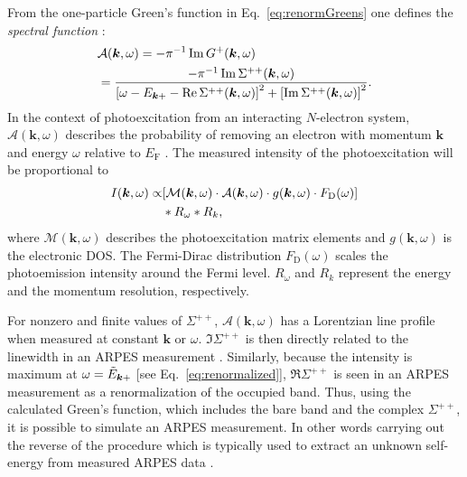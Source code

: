 \documentclass[aps, prb, twocolumn,amsmath,amssymb,floatfix]{revtex4-2}
\begin{document}

From the one-particle Green's function in Eq.~\eqref{eq:renormGreens} one  defines the  \emph{spectral function} \cite{damascelli2004probing}:
\begin{align}\label{eq:spectral}
    &\mathcal{A}(\boldsymbol{k},\omega) = -\pi^{-1}\Im G^+(\boldsymbol{k},\omega) \nonumber \\ &=\frac{-\pi^{-1}\Im\Sigma^{++}(\boldsymbol{k},\omega)}{\bqty{\omega-E_{\boldsymbol{k}+}-\Re\Sigma^{++}(\boldsymbol{k},\omega)}^2+\bqty{\Im\Sigma^{++}(\boldsymbol{k},\omega)}^2}.
\end{align}
In the context of photoexcitation from an interacting $N$-electron system, $\mathcal{A}(\boldsymbol{k},\omega)$ describes the probability of removing an electron with momentum $\boldsymbol{k}$ and energy $\omega$ relative to $E_{\text{F}}$ \cite{hufner2013photoelectron}. The measured intensity of the photoexcitation will be proportional to
\begin{align}\label{eq:ARPESint}
    I(\boldsymbol{k},\omega)\propto &\bqty{\mathcal{M}(\boldsymbol{k},\omega)\cdot\mathcal{A}(\boldsymbol{k},\omega)\cdot g(\boldsymbol{k},\omega)\cdot F_{\text{D}}(\omega)} \nonumber \\ 
    &\ast R_\omega \ast R_k,
\end{align}
where $\mathcal{M}(\boldsymbol{k},\omega)$ describes the photoexcitation matrix elements and $g(\boldsymbol{k},\omega)$ is the electronic DOS. The Fermi-Dirac distribution $F_{\text{D}}(\omega)$ scales the photoemission intensity around the Fermi level. $R_\omega$ and $R_k$ represent the energy and the momentum resolution, respectively.

For nonzero and finite values of $\Sigma^{++}$, $\mathcal{A}(\boldsymbol{k},\omega)$ has a Lorentzian line profile when measured at constant $\boldsymbol{k}$ or $\omega$. $\Im\Sigma^{++}$ is then directly related to the linewidth in an ARPES measurement \cite{gayone2005determining}. Similarly, because the intensity is maximum at
$\omega = \Tilde{E}_{\boldsymbol{k}+}$ [see Eq.~\eqref{eq:renormalized}],
$\Re\Sigma^{++}$ is seen in an ARPES measurement as a renormalization of the occupied band.  Thus, using the calculated Green's function, which includes the bare band and the complex $\Sigma^{++}$, it is possible to simulate an ARPES measurement. In other words carrying out the reverse of the procedure which is typically used to extract an unknown self-energy from measured ARPES data \cite{Pletikosic2012finding,Mazzola2017strong}.
\end{document}
